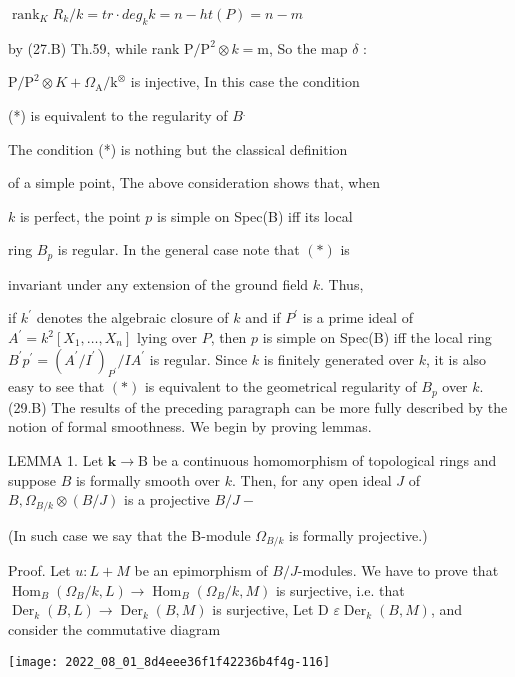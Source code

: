 $\operatorname{rank}_{K} R_{k} / k=t r \cdot d e g_{k} k=n-h t(P)=n-m$

by (27.B) Th.59, while rank $\mathrm{P} / \mathrm{P}^{2} \otimes k=\mathrm{m}$, So the map $\delta$ :

$\mathrm{P} / \mathrm{P}^{2} \otimes K+\Omega_{\mathrm{A}} / \mathrm{k}^{\otimes}$ is injective, In this case the condition

(*) is equivalent to the regularity of $B{ }^{\text {. }}$

The condition (*) is nothing but the classical definition

of a simple point, The above consideration shows that, when

$k$ is perfect, the point $p$ is simple on Spec(B) iff its local

ring $B_{p}$ is regular. In the general case note that $(*)$ is

invariant under any extension of the ground field $k$. Thus,

if $k^{\prime}$ denotes the algebraic closure of $k$ and if $P^{\prime}$ is a prime ideal of $A^{\prime}=k^{2}\left[X_{1}, \ldots, X_{n}\right]$ lying over $P$, then $p$ is simple on Spec(B) iff the local ring $B^{\prime} p^{\prime}=\left(A^{\prime} / I^{\prime}\right)_{P^{\prime}} / I A^{\prime}$ is regular. Since $k$ is finitely generated over $k$, it is also easy to see that $(*)$ is equivalent to the geometrical regularity of $B_{p}$ over $k$. (29.B) The results of the preceding paragraph can be more fully described by the notion of formal smoothness. We begin by proving lemmas.

LEMMA 1. Let $\mathbf{k} \rightarrow \mathrm{B}$ be a continuous homomorphism of topological rings and suppose $B$ is formally smooth over $k$. Then, for any open ideal $J$ of $B, \Omega_{B / k} \otimes(B / J)$ is a projective $B / J-$

(In such case we say that the B-module $\Omega_{B / k}$ is formally projective.)

Proof. Let $u: L+M$ be an epimorphism of $B / J$-modules. We have to prove that $\operatorname{Hom}_{B}\left(\Omega_{B} / k, L\right) \rightarrow \operatorname{Hom}_{B}\left(\Omega_{B} / k, M\right)$ is surjective, i.e. that $\operatorname{Der}_{k}(B, L) \rightarrow \operatorname{Der}_{k}(B, M)$ is surjective, Let D $\varepsilon \operatorname{Der}_{k}(B, M)$, and consider the commutative diagram

\texttt{[image: 2022\_08\_01\_8d4eee36f1f42236b4f4g-116]}

